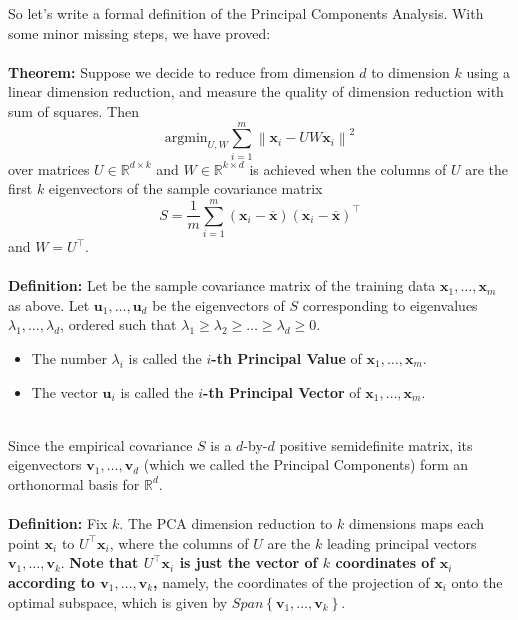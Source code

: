 \documentclass[11pt]{article}
\newcommand{\norm}[1]{\left\| #1\right\|}
\newcommand{\R}{\ensuremath{\mathbb{R}}}
\newcommand{\Tr}{\ensuremath{\top}}
\newcommand{\V}[1]{\mathbf{#1}}
\begin{document}
So let's write a formal definition of the Principal Components Analysis.
With some minor missing steps, we have proved:
\\~\\
 {\bf Theorem:} Suppose we decide to reduce from dimension $d$ to
 dimension $k$ using a linear dimension reduction, and measure the quality of
 dimension reduction with sum of squares. Then
            \[
              \text{argmin}_{U,W} \sum_{i=1}^m\norm{\V{x}_i - UW\V{x}_i}^2
         \]
         over matrices $U\in\R^{d\times k}$ and $W\in\R^{k\times d}$
         is achieved when the columns of $U$ are the first $k$ eigenvectors of
         the sample covariance matrix 
         \[
           S = \frac{1}{m}\sum_{i=1}^m (\V{x}_i-\overline{\V{x}}) 
           (\V{x}_i -\overline{\V{x}})^\Tr
         \]
         and $W=U^\Tr$.
\\~\\
 {\bf Definition:} Let
         be the sample covariance matrix of the training data
         $\V{x}_1,\ldots,\V{x}_m$ as above.
         Let $\V{u}_1,\ldots,\V{u}_d$ be the eigenvectors of $S$ corresponding
         to eigenvalues $\lambda_1,\ldots,\lambda_d$, ordered such that
         $\lambda_1\geq \lambda_2\geq \ldots \geq \lambda_d\geq 0$.


        \begin{itemize}
          \item The number $\lambda_i$ is called the {\bf $i$-th Principal
            Value} of  $\V{x}_1,\ldots,\V{x}_m$.
          \item The vector $\V{u}_i$ is called the {\bf $i$-th Principal
            Vector} of  $\V{x}_1,\ldots,\V{x}_m$.
        \end{itemize}
~\\
Since the empirical covariance $S$ is  a $d$-by-$d$ positive semidefinite
matrix, its eigenvectors $\V{v}_1,\ldots, \V{v}_d$ (which we called the Principal Components) form an
orthonormal basis for $\R^d$. 
\\~\\
{\bf Definition:} Fix $k$. 
The PCA dimension reduction to $k$ dimensions maps each point
$\V{x}_i$ to
$U^\top \V{x}_i$, where the columns of $U$ are the $k$ leading principal
vectors $\V{v}_1,\ldots,\V{v}_k$.
{\bf Note that $U^\top \V{x}_i$ is just the vector of $k$ coordinates of
$\V{x}_i$ according to $\V{v}_1,\ldots,\V{v}_k$,} namely, the
  coordinates of the projection of $\V{x}_i$ onto the optimal subspace, 
  which is given by $Span\left\{ \V{v}_1,\ldots,\V{v}_k \right\}$.
\end{document}
